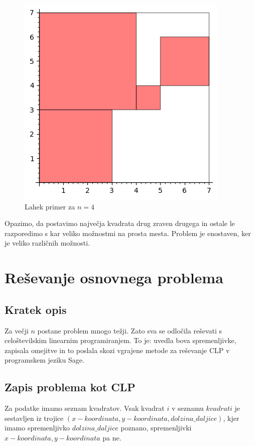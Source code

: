\documentclass[a4paper, 11pt]{article}
\begin{document}
\begin{figure}[H]
    \centering
    \includegraphics{prvi.png}
    \caption{Lahek primer za $n = 4$}
\end{figure}

Opazimo, da postavimo največja kvadrata drug zraven drugega in ostale le razporedimo s kar
veliko možnostmi na prosta mesta. Problem je enostaven, ker je veliko različnih možnosti.

\section{Reševanje osnovnega problema}
\subsection{Kratek opis}
Za večji $n$ postane problem mnogo težji. Zato sva se odločila reševati s celoštevilskim linearnim programiranjem.
To je: uvedla bova spremenljivke, zapisala omejitve in to poslala skozi vgrajene 
metode za reševanje CLP v programskem jeziku Sage.
\subsection{Zapis problema kot CLP}\label{osnovni CLP}
Za podatke imamo seznam kvadratov. Vsak kvadrat $i$ v seznamu $kvadrati$ je sestavljen
iz trojice $(x-koordinata,y-koordinata,dolzina\_daljice)$, kjer imamo spremenljivko $dolzina\_daljice$
poznano, spremenljivki $x-koordinata,y-koordinata$ pa ne.
\end{document}
